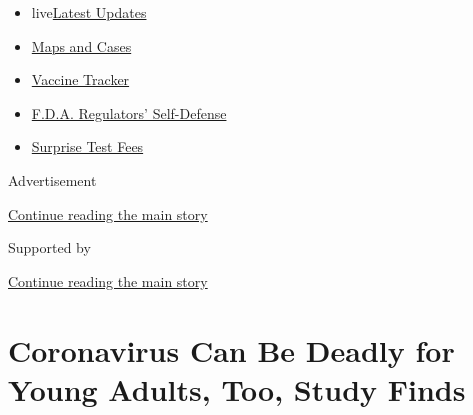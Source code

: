 \begin{itemize}
\tightlist
\item
  live\href{https://www.nytimes3xbfgragh.onion/2020/09/11/world/covid-19-coronavirus.html?name=styln-coronavirus-national\&region=TOP_BANNER\&block=storyline_menu_recirc\&action=click\&pgtype=Article\&impression_id=751379d0-f4b5-11ea-b564-bd1dfc5ec362\&variant=undefined}{Latest
  Updates}
\item
  \href{https://www.nytimes3xbfgragh.onion/interactive/2020/us/coronavirus-us-cases.html?name=styln-coronavirus-national\&region=TOP_BANNER\&block=storyline_menu_recirc\&action=click\&pgtype=Article\&impression_id=751379d1-f4b5-11ea-b564-bd1dfc5ec362\&variant=undefined}{Maps
  and Cases}
\item
  \href{https://www.nytimes3xbfgragh.onion/interactive/2020/science/coronavirus-vaccine-tracker.html?name=styln-coronavirus-national\&region=TOP_BANNER\&block=storyline_menu_recirc\&action=click\&pgtype=Article\&impression_id=751379d2-f4b5-11ea-b564-bd1dfc5ec362\&variant=undefined}{Vaccine
  Tracker}
\item
  \href{https://www.nytimes3xbfgragh.onion/2020/09/10/us/politics/fda-coronavirus-vaccine.html?name=styln-coronavirus-national\&region=TOP_BANNER\&block=storyline_menu_recirc\&action=click\&pgtype=Article\&impression_id=751379d3-f4b5-11ea-b564-bd1dfc5ec362\&variant=undefined}{F.D.A.
  Regulators' Self-Defense}
\item
  \href{https://www.nytimes3xbfgragh.onion/2020/09/09/upshot/coronavirus-surprise-test-fees.html?name=styln-coronavirus-national\&region=TOP_BANNER\&block=storyline_menu_recirc\&action=click\&pgtype=Article\&impression_id=751379d4-f4b5-11ea-b564-bd1dfc5ec362\&variant=undefined}{Surprise
  Test Fees}
\end{itemize}

Advertisement

\protect\hyperlink{after-top}{Continue reading the main story}

Supported by

\protect\hyperlink{after-sponsor}{Continue reading the main story}

\hypertarget{coronavirus-can-be-deadly-for-young-adults-too-study-finds}{%
\section{Coronavirus Can Be Deadly for Young Adults, Too, Study
Finds}\label{coronavirus-can-be-deadly-for-young-adults-too-study-finds}}

